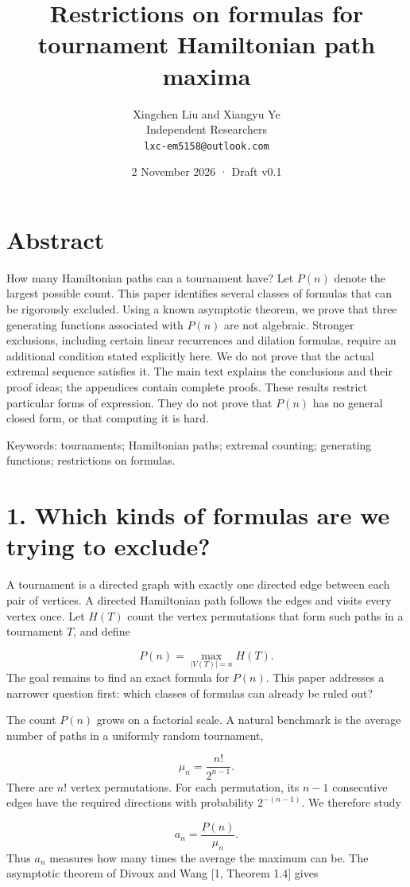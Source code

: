 \documentclass[11pt,a4paper]{article}
\title{Restrictions on formulas for tournament Hamiltonian path maxima}
\author{Xingchen Liu and Xiangyu Ye\\ Independent Researchers\\ \texttt{lxc-em5158@outlook.com}}
\date{2 November 2026 · Draft v0.1}
\begin{document}
\maketitle
\section*{Abstract}
How many Hamiltonian paths can a tournament have? Let $P(n)$ denote the largest possible count. This paper identifies several classes of formulas that can be rigorously excluded. Using a known asymptotic theorem, we prove that three generating functions associated with $P(n)$ are not algebraic. Stronger exclusions, including certain linear recurrences and dilation formulas, require an additional condition stated explicitly here. We do not prove that the actual extremal sequence satisfies it. The main text explains the conclusions and their proof ideas; the appendices contain complete proofs. These results restrict particular forms of expression. They do not prove that $P(n)$ has no general closed form, or that computing it is hard.

Keywords: tournaments; Hamiltonian paths; extremal counting; generating functions; restrictions on formulas.

\section*{1. Which kinds of formulas are we trying to exclude?}
A tournament is a directed graph with exactly one directed edge between each pair of vertices. A directed Hamiltonian path follows the edges and visits every vertex once. Let $H(T)$ count the vertex permutations that form such paths in a tournament $T$, and define

\[
P(n)=\max_{|V(T)|=n}H(T).
\]
The goal remains to find an exact formula for $P(n)$. This paper addresses a narrower question first: which classes of formulas can already be ruled out?

The count $P(n)$ grows on a factorial scale. A natural benchmark is the average number of paths in a uniformly random tournament,

\[
\mu_n=\frac{n!}{2^{n-1}}.
\]
There are $n!$ vertex permutations. For each permutation, its $n-1$ consecutive edges have the required directions with probability $2^{-(n-1)}$. We therefore study

\[
a_n=\frac{P(n)}{\mu_n}.
\]
Thus $a_n$ measures how many times the average the maximum can be. The asymptotic theorem of Divoux and Wang [1, Theorem 1.4] gives
\end{document}
